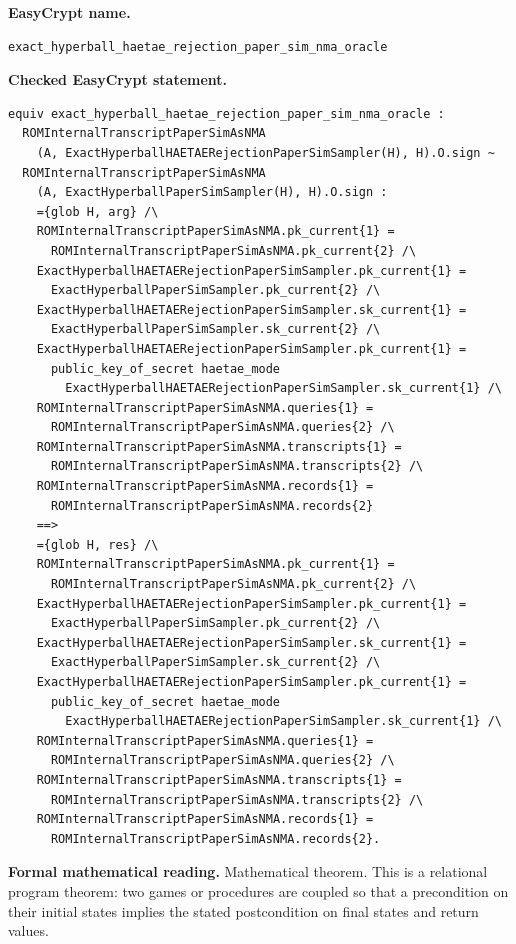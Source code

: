 \begin{formaltheorem}
\noindent\textbf{EasyCrypt name.}
\begin{lstlisting}[language=EasyCrypt,basicstyle=\ttfamily\scriptsize]
exact_hyperball_haetae_rejection_paper_sim_nma_oracle
\end{lstlisting}
\noindent\textbf{Checked EasyCrypt statement.}
\begin{lstlisting}[language=EasyCrypt,basicstyle=\ttfamily\scriptsize]
equiv exact_hyperball_haetae_rejection_paper_sim_nma_oracle :
  ROMInternalTranscriptPaperSimAsNMA
    (A, ExactHyperballHAETAERejectionPaperSimSampler(H), H).O.sign ~
  ROMInternalTranscriptPaperSimAsNMA
    (A, ExactHyperballPaperSimSampler(H), H).O.sign :
    ={glob H, arg} /\
    ROMInternalTranscriptPaperSimAsNMA.pk_current{1} =
      ROMInternalTranscriptPaperSimAsNMA.pk_current{2} /\
    ExactHyperballHAETAERejectionPaperSimSampler.pk_current{1} =
      ExactHyperballPaperSimSampler.pk_current{2} /\
    ExactHyperballHAETAERejectionPaperSimSampler.sk_current{1} =
      ExactHyperballPaperSimSampler.sk_current{2} /\
    ExactHyperballHAETAERejectionPaperSimSampler.pk_current{1} =
      public_key_of_secret haetae_mode
        ExactHyperballHAETAERejectionPaperSimSampler.sk_current{1} /\
    ROMInternalTranscriptPaperSimAsNMA.queries{1} =
      ROMInternalTranscriptPaperSimAsNMA.queries{2} /\
    ROMInternalTranscriptPaperSimAsNMA.transcripts{1} =
      ROMInternalTranscriptPaperSimAsNMA.transcripts{2} /\
    ROMInternalTranscriptPaperSimAsNMA.records{1} =
      ROMInternalTranscriptPaperSimAsNMA.records{2}
    ==>
    ={glob H, res} /\
    ROMInternalTranscriptPaperSimAsNMA.pk_current{1} =
      ROMInternalTranscriptPaperSimAsNMA.pk_current{2} /\
    ExactHyperballHAETAERejectionPaperSimSampler.pk_current{1} =
      ExactHyperballPaperSimSampler.pk_current{2} /\
    ExactHyperballHAETAERejectionPaperSimSampler.sk_current{1} =
      ExactHyperballPaperSimSampler.sk_current{2} /\
    ExactHyperballHAETAERejectionPaperSimSampler.pk_current{1} =
      public_key_of_secret haetae_mode
        ExactHyperballHAETAERejectionPaperSimSampler.sk_current{1} /\
    ROMInternalTranscriptPaperSimAsNMA.queries{1} =
      ROMInternalTranscriptPaperSimAsNMA.queries{2} /\
    ROMInternalTranscriptPaperSimAsNMA.transcripts{1} =
      ROMInternalTranscriptPaperSimAsNMA.transcripts{2} /\
    ROMInternalTranscriptPaperSimAsNMA.records{1} =
      ROMInternalTranscriptPaperSimAsNMA.records{2}.
\end{lstlisting}
\noindent\textbf{Formal mathematical reading.}
Mathematical theorem. This is a relational program theorem: two games or procedures are coupled so that a precondition on their initial states implies the stated postcondition on final states and return values.


\end{formaltheorem}
